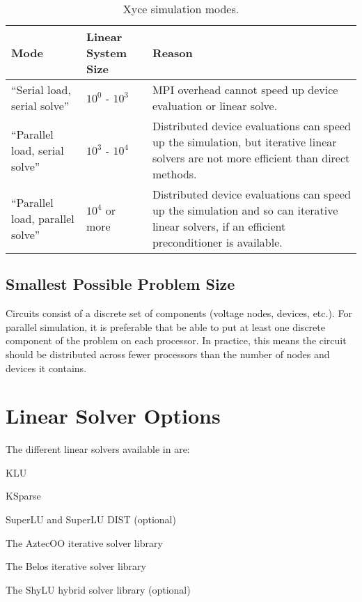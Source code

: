 \begin{table}[htp]
\caption[\Xyce{} Simulation Modes]{Xyce simulation modes.}
\label{tab:sim:modes}
\begin{center}
\begin{tabular}{| p{5cm} | p{3.5cm} | p{7cm} |}
\hline
Mode & Linear System Size & Reason \\
\hline
``Serial load, serial solve'' & $10^0$ - $10^3$ & MPI overhead cannot speed up device evaluation or linear solve. \\
``Parallel load, serial solve'' & $10^3$ - $10^4$ & Distributed device evaluations can speed up the simulation, but 
iterative linear solvers are not more efficient than direct methods.\\
``Parallel load, parallel solve'' & $10^4$ or more & Distributed device evaluations can speed up the simulation and
so can iterative linear solvers, if an efficient preconditioner is available. \\
\hline
\end{tabular}
\end{center}
\end{table}

\subsection{Smallest Possible Problem Size}
Circuits consist of a discrete set of components (voltage nodes, devices, etc.). For parallel simulation, it is preferable that \Xyce{} be able to put 
at least one discrete component of the problem on each processor. In practice, this means the circuit should be distributed across fewer processors than 
the number of nodes and devices it contains.

\section{Linear Solver Options}
\label{LinearSolver_Options}

The different linear solvers available in \Xyce{} are:

\begin{XyceItemize}
  \item KLU
  \item KSparse
  \item SuperLU and SuperLU DIST (optional)
  \item The AztecOO iterative solver library
  \item The Belos iterative solver library
  \item The ShyLU hybrid solver library (optional)
\end{XyceItemize}

